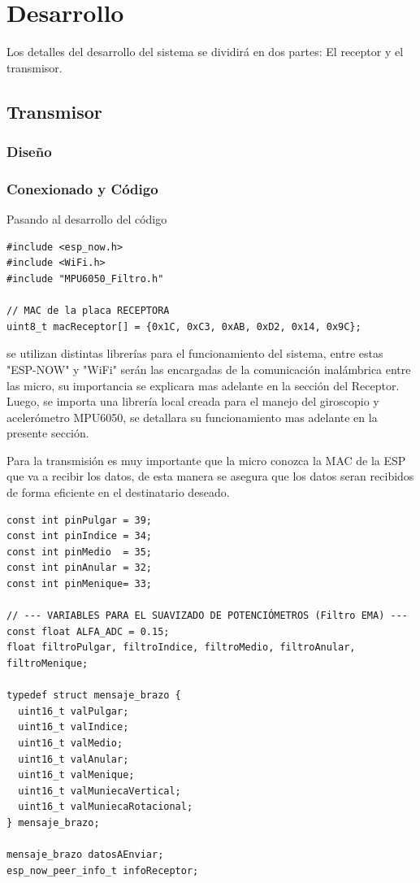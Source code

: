 \documentclass[10pt]{article}
\begin{document}
\section{Desarrollo}

Los detalles del desarrollo del sistema se dividirá en dos partes: El receptor y el transmisor.

\subsection{Transmisor}

\subsubsection{Diseño}

\subsubsection{Conexionado y Código}

Pasando al desarrollo del código

\begin{lstlisting}
#include <esp_now.h>
#include <WiFi.h>
#include "MPU6050_Filtro.h"

// MAC de la placa RECEPTORA
uint8_t macReceptor[] = {0x1C, 0xC3, 0xAB, 0xD2, 0x14, 0x9C};
\end{lstlisting}

se utilizan distintas librerías para el funcionamiento del sistema, entre estas "ESP-NOW" y "WiFi" serán las encargadas de la comunicación inalámbrica entre las micro, su importancia se explicara mas adelante en la sección del Receptor. Luego, se importa una librería local creada para el manejo del giroscopio y acelerómetro MPU6050, se detallara su funcionamiento mas adelante en la presente sección.

Para la transmisión es muy importante que la micro conozca la MAC de la ESP que va a recibir los datos, de esta manera se asegura que los datos seran recibidos de forma eficiente en el destinatario deseado.

\begin{lstlisting}
const int pinPulgar = 39; 
const int pinIndice = 34; 
const int pinMedio  = 35;
const int pinAnular = 32;
const int pinMenique= 33;

// --- VARIABLES PARA EL SUAVIZADO DE POTENCIÓMETROS (Filtro EMA) ---
const float ALFA_ADC = 0.15; 
float filtroPulgar, filtroIndice, filtroMedio, filtroAnular, filtroMenique;

typedef struct mensaje_brazo {
  uint16_t valPulgar;
  uint16_t valIndice;
  uint16_t valMedio;
  uint16_t valAnular;
  uint16_t valMenique;
  uint16_t valMuniecaVertical;
  uint16_t valMuniecaRotacional;
} mensaje_brazo;

mensaje_brazo datosAEnviar;
esp_now_peer_info_t infoReceptor;
\end{lstlisting}
\end{document}
